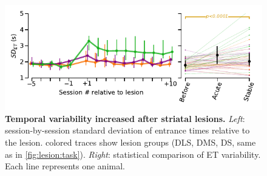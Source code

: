 \begin{figure}[!h]
  \begin{center}
    \includegraphics[scale=1]{ch-appendicies/figures/SDofET.pdf}
    \caption[Temporal Variability After Lesion]
    {\textbf{Temporal variability increased after striatal lesions.}
    \textit{Left}: session-by-session standard deviation of entrance times relative to the lesion.
    colored traces show lesion groups (DLS, DMS, DS, same as in \autoref{fig:lesion:task}).
    \textit{Right}: statistical comparison of ET variability.
    Each line represents one animal.
    }
    \label{fig:appendix:SdofET}
  \end{center}
\end{figure}